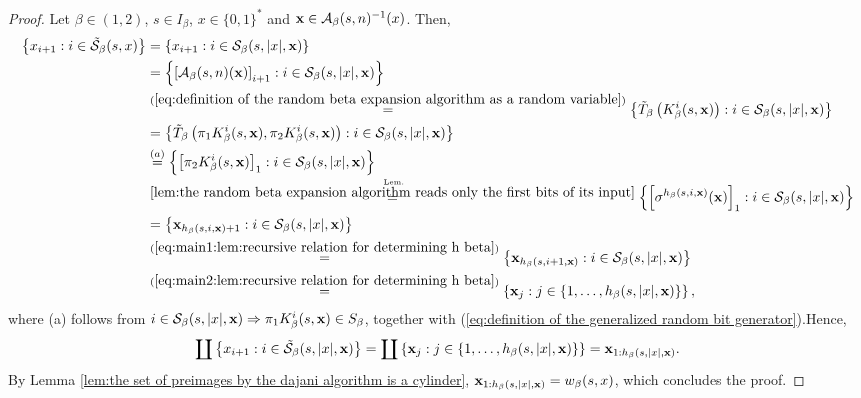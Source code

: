 \begin{proof}
    Let $\beta \in (1,2)$, $s \in I_\beta$, $x \in \{0,1\}^\ast$ and ${\bf x} \in \mathcal{A}_\beta(s,n)^{-1}(x)$. Then, 
    \begin{align}
        \left\{ x_{i+1} : i \in \tilde \SM_\beta(s,x)\right\} &= \left\{ x_{i+1} : i \in  \SM_\beta(s,|x|,\xf)\right\}\\
        &= \left\{\left[\AM_\beta(s,n)(\xf)\right]_{i+1} : i \in  \SM_\beta(s,|x|,\xf) \right\}\\
        &\overset{(\ref{eq:definition of the random beta expansion algorithm as a random variable})}{=} \left\{\tilde T_\beta\left(K_\beta^i(s,\xf) \right) : i \in  \SM_\beta(s,|x|,\xf) \right\}\\
        &=\left\{\tilde T_\beta\left(\pi_1K_\beta^i(s,\xf), \pi_2K_\beta^i(s,\xf) \right) : i \in  \SM_\beta(s,|x|,\xf) \right\}\\
        &\overset{(a)}{=} \left\{\left[\pi_2K_\beta^i(s,\xf)\right]_1 : i \in  \SM_\beta(s,|x|,\xf) \right\}\\
        &\osetlem{\ref{lem:the random beta expansion algorithm reads only the first bits of its input}}{=} \left\{\left[\sigma^{h_\beta(s,i,\xf)}(\xf)\right]_1 : i \in  \SM_\beta(s,|x|,\xf) \right\}\\
        &= \left\{\xf_{h_\beta(s,i,\xf)+1} : i \in  \SM_\beta(s,|x|,\xf) \right\}\\
        &\overset{(\ref{eq:main1:lem:recursive relation for determining h beta})}{=} \left\{\xf_{h_\beta(s,i+1,\xf)} : i \in  \SM_\beta(s,|x|,\xf) \right\}\\
        &\overset{(\ref{eq:main2:lem:recursive relation for determining h beta})}{=} \left\{\xf_j : j \in \{1,\ldots, h_\beta(s,|x|,\xf)\} \right\},
    \end{align}
    where (a) follows from $i \in \mathcal{S}_\beta(s,|x|,{\bf x}) \Rightarrow \pi_1K_\beta^i(s,{\bf x}) \in S_\beta$, together with (\ref{eq:definition of the generalized random bit generator}).Hence,
    \begin{equation}
        \coprod \left\{ x_{i+1} : i \in \tilde {\mathcal{S}}_\beta(s,|x|,{\bf x})\right\} = \coprod \left\{{\bf x}_j : j \in \{1,\ldots, h_\beta(s,|x|,{\bf x})\} \right\} = {\bf x}_{1:h_\beta(s,|x|,{\bf x})}.
    \end{equation}
    By Lemma \ref{lem:the set of preimages by the dajani algorithm is a cylinder}, ${\bf x}_{1:h_\beta(s,|x|,{\bf x})} = w_\beta(s,x)$, which concludes the proof.
    
    

\end{proof}

